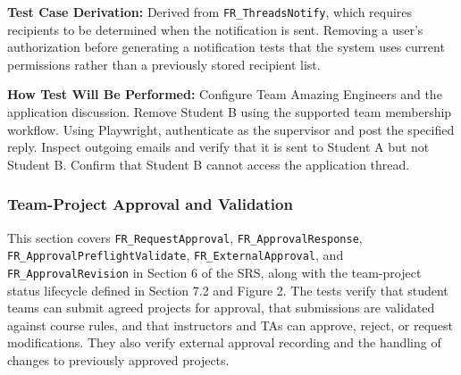 \documentclass[12pt, titlepage]{article}
\begin{document}
\begin{enumerate}
\textbf{Test Case Derivation:} Derived from \texttt{FR\_ThreadsNotify}, which requires recipients to be determined when the notification is sent. Removing a user's authorization before generating a notification tests that the system uses current permissions rather than a previously stored recipient list.

\textbf{How Test Will Be Performed:} Configure Team Amazing Engineers and the application discussion. Remove Student B using the supported team membership workflow. Using Playwright, authenticate as the supervisor and post the specified reply. Inspect outgoing emails and verify that it is sent to Student A but not Student B. Confirm that Student B cannot access the application thread.

\end{enumerate}

\subsubsection{Team-Project Approval and Validation}

This section covers \texttt{FR\_RequestApproval}, \texttt{FR\_ApprovalResponse}, \texttt{FR\_ApprovalPreflightValidate}, \texttt{FR\_ExternalApproval}, and \texttt{FR\_ApprovalRevision} in Section 6 of the SRS, along with the team-project status lifecycle defined in Section 7.2 and Figure 2. The tests verify that student teams can submit agreed projects for approval, that submissions are validated against course rules, and that instructors and TAs can approve, reject, or request modifications. They also verify external approval recording and the handling of changes to previously approved projects.
\end{document}
